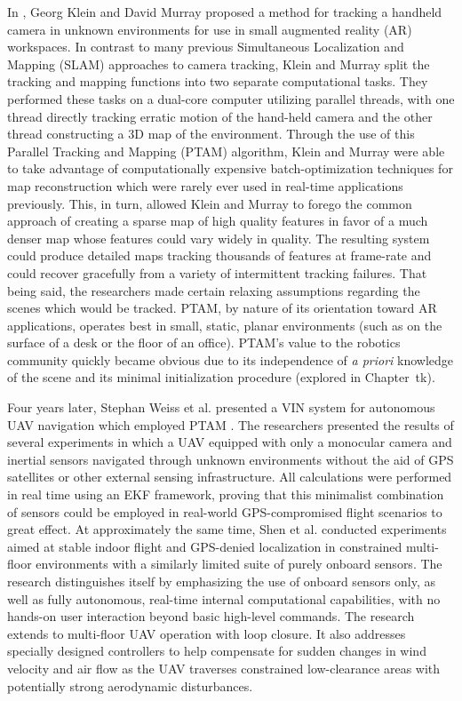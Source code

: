 In \cite{Klein2007}, Georg Klein and David Murray proposed a method for tracking a handheld camera in unknown environments for use in small augmented reality (AR) workspaces. In contrast to many previous Simultaneous Localization and Mapping (SLAM) approaches to camera tracking, Klein and Murray split the tracking and mapping functions into two separate computational tasks. They performed these tasks on a dual-core computer utilizing parallel threads, with one thread directly tracking erratic motion of the hand-held camera and the other thread constructing a 3D map of the environment. Through the use of this Parallel Tracking and Mapping (PTAM) algorithm, Klein and Murray were able to take advantage of computationally expensive batch-optimization techniques for map reconstruction which were rarely ever used in real-time applications previously. This, in turn, allowed Klein and Murray to forego the common approach of creating a sparse map of high quality features in favor of a much denser map whose features could vary widely in quality. The resulting system could produce detailed maps tracking thousands of features at frame-rate and could recover gracefully from a variety of intermittent tracking failures. That being said, the researchers made certain relaxing assumptions regarding the scenes which would be tracked. PTAM, by nature of its orientation toward AR applications, operates best in small, static, planar environments (such as on the surface of a desk or the floor of an office). PTAM's value to the robotics community quickly became obvious due to its independence of \textit{a priori} knowledge of the scene and its minimal initialization procedure (explored in Chapter~tk). 

Four years later, Stephan Weiss et al. presented a VIN system for autonomous UAV navigation which employed PTAM \cite{Weiss2011}. The researchers presented the results of several experiments in which a UAV equipped with only a monocular camera and inertial sensors navigated through unknown environments without the aid of GPS satellites or other external sensing infrastructure. All calculations were performed in real time using an EKF framework, proving that this minimalist combination of sensors could be employed in real-world GPS-compromised flight scenarios to great effect. At approximately the same time, Shen et al. \cite{Shen2011} conducted experiments aimed at stable indoor flight and GPS-denied localization in constrained multi-floor environments with a similarly limited suite of purely onboard sensors. The research distinguishes itself by emphasizing the use of onboard sensors only, as well as fully autonomous, real-time internal computational capabilities, with no hands-on user interaction beyond basic high-level commands. The research extends to multi-floor UAV operation with loop closure. It also addresses specially designed controllers to help compensate for sudden changes in wind velocity and air flow as the UAV traverses constrained low-clearance areas with potentially strong aerodynamic disturbances.


